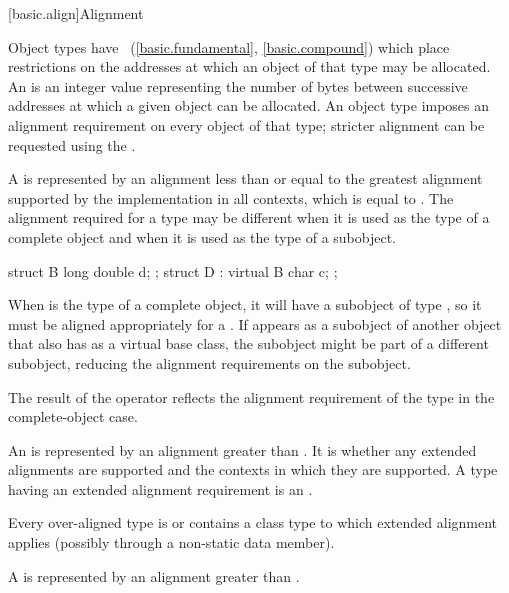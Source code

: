[basic.align]{Alignment}

\pnum
Object types have ~(\ref{basic.fundamental}, \ref{basic.compound})
which place restrictions on the addresses at which an object of that type
may be allocated. An  is an 
integer value representing the number of bytes between successive addresses
at which a given object can be allocated. An object type imposes an alignment
requirement on every object of that type; stricter alignment can be requested
using the .

\pnum
A  is represented by an alignment
less than or equal to the greatest alignment supported by the implementation in
all contexts, which is equal to
.
The alignment required for a type may be different when it is used as the type
of a complete object and when it is used as the type of a subobject.
\begin{example}
\begin{codeblock}
struct B { long double d; };
struct D : virtual B { char c; };
\end{codeblock}

When  is the type of a complete object, it will have a subobject of
type , so it must be aligned appropriately for a .
If  appears as a subobject of another object that also has 
as a virtual base class, the  subobject might be part of a different
subobject, reducing the alignment requirements on the  subobject.
\end{example}
The result of the  operator reflects the alignment
requirement of the type in the complete-object case.

\pnum
An  is represented by an alignment
greater than . It is 
whether any extended alignments are supported and the contexts in which they are
supported. A type having an extended alignment
requirement is an .
\begin{note}
Every over-aligned type is or contains a class type
to which extended alignment applies (possibly through a non-static data member).
\end{note}
A  is represented by
an alignment greater than .

